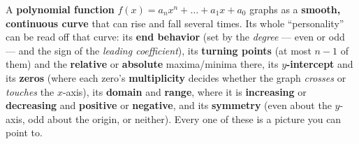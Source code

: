 \documentclass[10pt]{article}
\begin{document}
\vspace{0.10in}

\begin{remindbox}
\small A \textbf{polynomial function} $f(x)=a_nx^n+\dots+a_1x+a_0$ graphs as a \textbf{smooth,
continuous curve} that can rise and fall several times. Its whole ``personality'' can be read off
that curve: its \textbf{end behavior} (set by the \emph{degree} --- even or odd --- and the sign of
the \emph{leading coefficient}), its \textbf{turning points} (at most $n-1$ of them) and the
\textbf{relative} or \textbf{absolute} maxima/minima there, its \textbf{$y$-intercept} and its
\textbf{zeros} (where each zero's \textbf{multiplicity} decides whether the graph \emph{crosses} or
\emph{touches} the $x$-axis), its \textbf{domain} and \textbf{range}, where it is \textbf{increasing}
or \textbf{decreasing} and \textbf{positive} or \textbf{negative}, and its \textbf{symmetry} (even
about the $y$-axis, odd about the origin, or neither). Every one of these is a picture you can point
to.
\end{remindbox}
\end{document}
